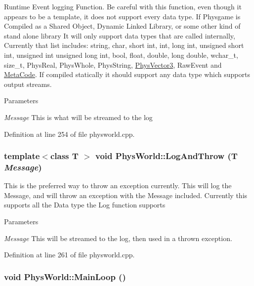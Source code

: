 Runtime Event logging Function. Be careful with this function, even though it appears to be a template, it does not support every data type. If Physgame is Compiled as a Shared Object, Dynamic Linked Library, or some other kind of stand alone library It will only support data types that are called internally, Currently that list includes: string, char, short int, int, long int, unsigned short int, unsigned int unsigned long int, bool, float, double, long double, wchar\_\-t, size\_\-t, PhysReal, PhysWhole, PhysString, \hyperlink{classPhysVector3}{PhysVector3}, RawEvent and \hyperlink{classMetaCode}{MetaCode}. If compiled statically it should support any data type which supports output streams. 
\begin{DoxyParams}{Parameters}
\item[{\em Message}]This is what will be streamed to the log \end{DoxyParams}


Definition at line 254 of file physworld.cpp.\hypertarget{classPhysWorld_a1c2aeaed2a89821a4545db854da33ab8}{
\subsubsection[{LogAndThrow}]{\setlength{\rightskip}{0pt plus 5cm}template$<$class T $>$ void PhysWorld::LogAndThrow (T {\em Message})}}
\label{db/df5/classPhysWorld_a1c2aeaed2a89821a4545db854da33ab8}


This is the preferred way to throw an exception currently. This will log the Message, and will throw an exception with the Message included. Currently this supports all the Data type the Log function supports 
\begin{DoxyParams}{Parameters}
\item[{\em Message}]This will be streamed to the log, then used in a thrown exception. \end{DoxyParams}


Definition at line 261 of file physworld.cpp.\hypertarget{classPhysWorld_ad41cad0347b6f5ba7ec05568aaffa514}{
\subsubsection[{MainLoop}]{\setlength{\rightskip}{0pt plus 5cm}void PhysWorld::MainLoop ()}}
\label{db/df5/classPhysWorld_ad41cad0347b6f5ba7ec05568aaffa514}


